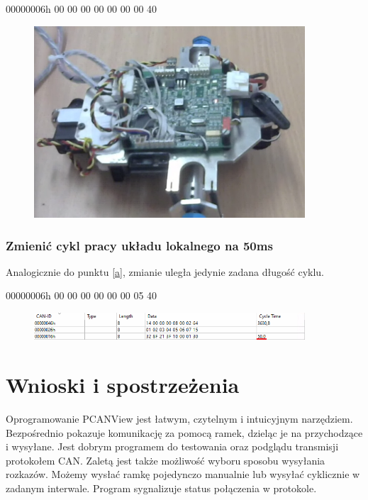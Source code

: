 \documentclass[margin = 2cm]{article}
\begin{document}
00000006h	00 00 00 00 00 00 00 40
		\begin{figure}[H]
			\centering
			\includegraphics[width=0.9\textwidth]{min}
		\end{figure}
		\subsubsection{Zmienić cykl pracy układu lokalnego na 50ms}
Analogicznie do punktu \ref{a}, zmianie uległa jedynie zadana długość cyklu.

00000006h	00 00 00 00 00 00 05 40
		\begin{figure}[H]
			\centering
			\includegraphics[width=0.9\textwidth]{50ms}
		\end{figure}
\section{Wnioski i spostrzeżenia}
Oprogramowanie PCANView jest łatwym, czytelnym i intuicyjnym narzędziem. Bezpośrednio pokazuje komunikację za pomocą ramek, dzieląc je na przychodzące i wysyłane. Jest dobrym programem do testowania oraz podglądu transmisji protokołem CAN. Zaletą jest także możliwość wyboru sposobu wysyłania rozkazów. Możemy wysłać ramkę pojedynczo manualnie lub wysyłać cyklicznie w zadanym interwale. Program sygnalizuje status połączenia w protokole. 
\end{document}
